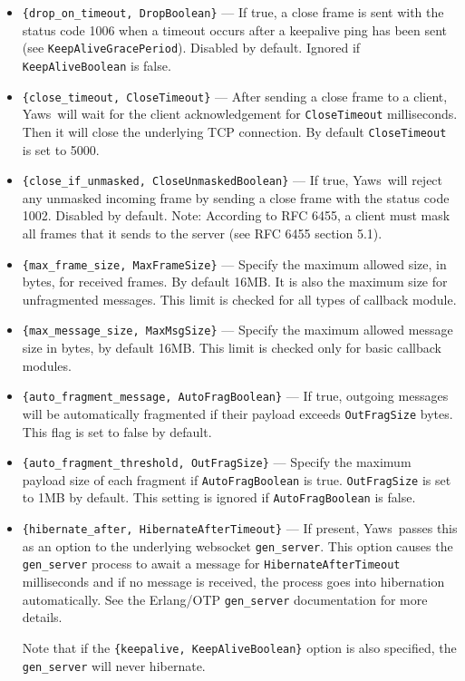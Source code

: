\documentclass[11pt,oneside,english]{book}
\newcommand{\Yaws}            %
        {{\sc Yaws}}
\begin{document}
\begin{itemize}
    \item \verb+{drop_on_timeout, DropBoolean}+ ---
      If true, a close frame is sent with the status code 1006 when a timeout
      occurs after a keepalive ping has been sent (see
      \verb+KeepAliveGracePeriod+). Disabled by default. Ignored if
      \verb+KeepAliveBoolean+ is false.

    \item \verb+{close_timeout, CloseTimeout}+ ---
      After sending a close frame to a client, \Yaws\ will wait for the client
      acknowledgement for \verb+CloseTimeout+ milliseconds. Then it will
      close the underlying TCP connection. By default \verb+CloseTimeout+ is set
      to 5000.

    \item \verb+{close_if_unmasked, CloseUnmaskedBoolean}+ ---
      If true, \Yaws\ will reject any unmasked incoming frame by sending a close
      frame with the status code 1002. Disabled by default. Note: According to
      RFC 6455, a client must mask all frames that it sends to the server (see
      RFC 6455 section 5.1).

    \item \verb+{max_frame_size, MaxFrameSize}+ ---
      Specify the maximum allowed size, in bytes, for received frames. By
      default 16MB. It is also the maximum size for unfragmented
      messages. This limit is checked for all types of callback module.

    \item \verb+{max_message_size, MaxMsgSize}+ ---
      Specify the maximum allowed message size in bytes, by default 16MB. This
      limit is checked only for basic callback modules.

    \item \verb+{auto_fragment_message, AutoFragBoolean}+ ---
      If true, outgoing messages will be automatically fragmented if their
      payload exceeds \verb+OutFragSize+ bytes. This flag is set to false by
      default.

    \item \verb+{auto_fragment_threshold, OutFragSize}+ ---
      Specify the maximum payload size of each fragment if
      \verb+AutoFragBoolean+ is true. \verb+OutFragSize+ is set to 1MB by
      default. This setting is ignored if \verb+AutoFragBoolean+ is false.

    \item \verb+{hibernate_after, HibernateAfterTimeout}+ ---
      If present, \Yaws\ passes this as an option to the underlying
      websocket \verb+gen_server+. This option causes the
      \verb+gen_server+ process to await a message for
      \verb+HibernateAfterTimeout+ milliseconds and if no message is
      received, the process goes into hibernation automatically. See
      the Erlang/OTP \verb+gen_server+ documentation for more details.

      Note that if the \verb+{keepalive, KeepAliveBoolean}+ option is
      also specified, the \verb+gen_server+ will never hibernate.
\end{itemize}
\end{document}
